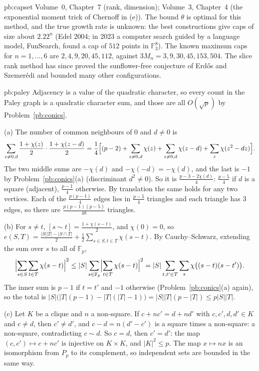 \begin{solution}{pb:capset}
\tools Volume~0, Chapter~7 (rank, dimension); Volume~3, Chapter~4 (the exponential moment trick of Chernoff in (e)).
\leads The bound $\theta$ is optimal for this method, and the true growth rate is unknown: the best constructions give caps of size
about $2.22^n$ (Edel 2004; in 2023 a computer search guided by a language model, FunSearch, found a cap of $512$ points in $\mathbb F_3^8$).
The known maximum caps for $n=1,\dots,6$ are $2,4,9,20,45,112$, against $3M_n=3,9,30,45,153,504$. The slice rank method has since
proved the sunflower-free conjecture of Erdős and Szemerédi and bounded many other configurations.
\end{solution}

\begin{solution}{pb:paley}
\idea Adjacency is a value of the quadratic character, so every count in the Paley graph is a quadratic character sum, and those
are all $O(\sqrt p)$ by Problem~\ref{pb:conics}.

\writeup (a) The number of common neighbours of $0$ and $d\ne0$ is
\[
\sum_{z\ne0,d}\frac{1+\chi(z)}2\cdot\frac{1+\chi(z-d)}2=\frac14\Bigl[(p-2)+\sum_{z\ne0,d}\chi(z)+\sum_{z\ne0,d}\chi(z-d)+\sum_z\chi(z^2-dz)\Bigr].
\]
The two middle sums are $-\chi(d)$ and $-\chi(-d)=-\chi(d)$, and the last is $-1$ by Problem~\ref{pb:conics}(a) (discriminant $d^2\ne0$).
So it is $\frac{p-3-2\chi(d)}4$: $\frac{p-5}4$ if $d$ is a square (adjacent), $\frac{p-1}4$ otherwise. By translation the same holds for
any two vertices. Each of the $\frac{p(p-1)}4$ edges lies in $\frac{p-5}4$ triangles and each triangle has $3$ edges, so there are
$\frac{p(p-1)(p-5)}{48}$ triangles.

(b) For $s\ne t$, $[s\sim t]=\frac{1+\chi(s-t)}2$, and $\chi(0)=0$, so
$e(S,T)=\frac{|S||T|-|S\cap T|}2+\frac12\sum_{s\in S,t\in T}\chi(s-t)$. By Cauchy--Schwarz, extending the sum over $s$ to all of
$\mathbb F_p$,
\[
\Bigl|\sum_{s\in S}\sum_{t\in T}\chi(s-t)\Bigr|^2\le|S|\sum_{s\in\mathbb F_p}\Bigl|\sum_{t\in T}\chi(s-t)\Bigr|^2
=|S|\sum_{t,t'\in T}\sum_s\chi\bigl((s-t)(s-t')\bigr).
\]
The inner sum is $p-1$ if $t=t'$ and $-1$ otherwise (Problem~\ref{pb:conics}(a) again), so the total is
$|S|\bigl(|T|(p-1)-|T|(|T|-1)\bigr)=|S||T|(p-|T|)\le p|S||T|$.

(c) Let $K$ be a clique and $n$ a non-square. If $c+nc'=d+nd'$ with $c,c',d,d'\in K$ and $c\ne d$, then $c'\ne d'$, and
$c-d=n(d'-c')$ is a square times a non-square: a non-square, contradicting $c\sim d$. So $c=d$, then $c'=d'$: the map
$(c,c')\mapsto c+nc'$ is injective on $K\times K$, and $|K|^2\le p$. The map $x\mapsto nx$ is an isomorphism from $P_p$ to its
complement, so independent sets are bounded in the same way.


\end{solution}
